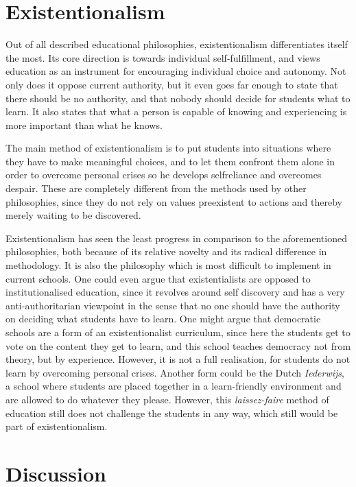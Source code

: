 \section{Existentionalism}

Out of all described educational philosophies, existentionalism differentiates itself the most. Its core direction is towards individual self-fulfillment, and views education as an instrument for encouraging individual choice and autonomy. Not only does it oppose current authority, but it even goes far enough to state that there should be no authority, and that nobody should decide for students what to learn. It also states that what a person is capable of knowing and experiencing is more important than what he knows.

The main method of existentionalism is to put students into situations where they have to make meaningful choices, and to let them confront them alone in order to overcome personal crises so he develops selfreliance and overcomes despair. These are completely different from the methods used by other philosophies, since they do not rely on values preexistent to actions and thereby merely waiting to be discovered.

Existentionalism has seen the least progress in comparison to the aforementioned philosophies, both because of its relative novelty and its radical difference in methodology. It is also the philosophy which is most difficult to implement in current schools. One could even argue that existentialists are opposed to institutionalised education, since it revolves around self discovery and has a very anti-authoritarian viewpoint in the sense that no one should have the authority on deciding what students have to learn. One might argue that democratic schools are a form of an existentionalist curriculum, since here the students get to vote on the content they get to learn, and this school teaches democracy not from theory, but by experience. However, it is not a full realisation, for students do not learn by overcoming personal crises. Another form could be the Dutch \emph{Iederwijs}, a school where students are placed together in a learn-friendly environment and are allowed to do whatever they please. However, this \emph{laissez-faire} method of education still does not challenge the students in any way, which still would be part of existentionalism.

\section{Discussion}
